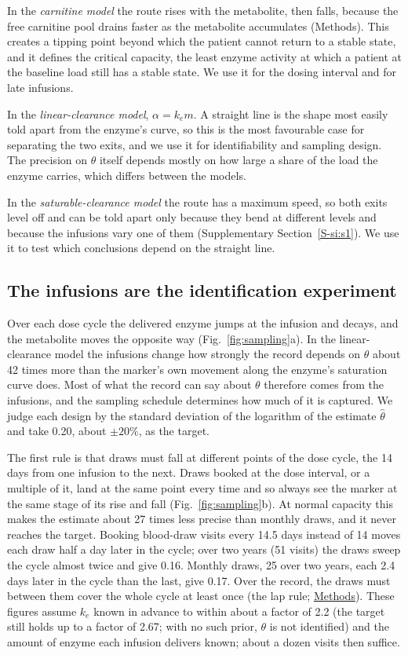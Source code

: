 \documentclass[11pt]{article}
\begin{document}
In the \emph{carnitine model} the route rises with the metabolite, then falls, because the free
carnitine pool drains faster as the metabolite accumulates (Methods). This creates a tipping point beyond which the patient cannot
return to a stable state, and it defines the critical capacity, the least enzyme activity at which
a patient at the baseline load still has a stable state. We use it for the dosing interval and
for late infusions.

In the \emph{linear-clearance model}, $\alpha=k_e m$. A straight line is the shape most easily told
apart from the enzyme's curve, so this is the most favourable case for separating the two exits,
and we use it for identifiability and sampling design. The precision on $\theta$ itself depends
mostly on how large a share of the load the enzyme carries, which differs between the models.

In the \emph{saturable-clearance model} the route has a maximum speed, so both exits level off and
can be told apart only because they bend at different levels and because the infusions vary one
of them (Supplementary Section~\ref{S-si:s1}). We use it to test which conclusions depend on the straight
line.

\subsection*{The infusions are the identification experiment}
Over each dose cycle the delivered enzyme jumps at the infusion and decays, and the metabolite
moves the opposite way (Fig.~\ref{fig:sampling}a). In the linear-clearance model the
infusions change how strongly the record depends on $\theta$ about 42 times more than the marker's
own movement along the enzyme's saturation curve does. Most of what the record can say about
$\theta$ therefore comes from the infusions, and the sampling schedule determines how much of it
is captured. We judge each design by
the standard deviation of the logarithm of the estimate $\hat\theta$ and take 0.20, about
$\pm20\%$, as the target.

The first rule is that draws must fall at different points of the dose cycle, the 14 days from one
infusion to the next. Draws booked at the dose interval, or a multiple of it, land at the same
point every time and so always see the marker at the same stage of its rise and fall
(Fig.~\ref{fig:sampling}b). At normal capacity this makes the
estimate about 27 times less precise than monthly draws, and it never reaches the target. Booking
blood-draw visits every 14.5 days instead of 14 moves each draw half a day later in the cycle;
over two years (51 visits) the draws sweep the cycle almost twice and give 0.16. Monthly draws, 25
over two years, each 2.4 days later in the cycle than the last, give 0.17. Over the record, the
draws must between them cover the whole cycle at least once (the lap rule; \hyperref[sec:sampling]{Methods}). These figures
assume $k_e$ known in advance to within about a factor of 2.2 (the target still holds up to a
factor of 2.67; with no such prior, $\theta$ is not identified) and the amount of enzyme each
infusion delivers known; about a dozen visits then suffice.
\end{document}

